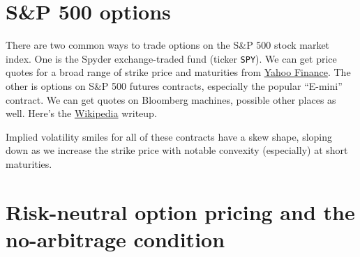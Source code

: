 \documentclass[11pt]{article}
\begin{document}
\begin{comment}
\section{Derivatives of the BSM formula}

Most treatments go on to list derivatives of the BSM formula
with respect to its inputs.
You can look these up in
\href{http://en.wikipedia.org/wiki/Black-Scholes_model#The_Greeks}{Wikipedia}.
We'll use one:  the derivative with respect to volatility $\sigma$.
The so-called ``vega'' is
\begin{eqnarray*}
    \partial q^p_t /\partial \sigma &=&
            s_t N'(d) \tau^{1/2} ,
\end{eqnarray*}
where $N'$ is the standard normal pdf, equation (\ref{eq:pdf-stdnormal}).
We'll use this as an input to Newton's method when we compute
implied volatilities.
\end{comment}


\section{S\&P 500 options}

There are two common ways to trade options on the S\&P 500 stock market index.
One is the Spyder exchange-traded fund (ticker {\tt SPY}).
We can get price quotes for a broad range of strike price and maturities
from
\href{http://finance.yahoo.com/q/op?s=SPY+Options}{Yahoo Finance}.
The other is options on S\&P 500 futures contracts,
especially the popular ``E-mini'' contract.
We can get quotes on Bloomberg machines, possible other places as well.
Here's the \href{http://en.wikipedia.org/wiki/E-mini_S&P}{Wikipedia} writeup.

Implied volatility smiles for all of these contracts have a skew shape, sloping
down as we increase the strike price with notable convexity (especially) at short maturities.


\section{Risk-neutral option pricing and the no-arbitrage condition}
\end{document}
